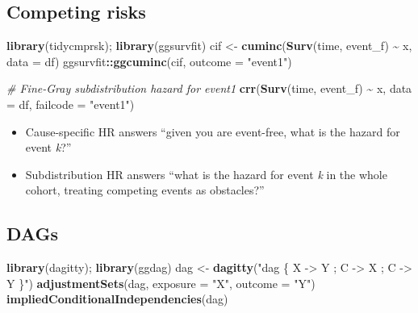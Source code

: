 \documentclass[
]{article}
\newenvironment{Shaded}{\begin{snugshade}}{\end{snugshade}}
\newcommand{\AttributeTok}[1]{\textcolor[rgb]{0.13,0.29,0.53}{#1}}
\newcommand{\CommentTok}[1]{\textcolor[rgb]{0.56,0.35,0.01}{\textit{#1}}}
\newcommand{\FunctionTok}[1]{\textcolor[rgb]{0.13,0.29,0.53}{\textbf{#1}}}
\newcommand{\NormalTok}[1]{#1}
\newcommand{\OtherTok}[1]{\textcolor[rgb]{0.56,0.35,0.01}{#1}}
\newcommand{\SpecialCharTok}[1]{\textcolor[rgb]{0.81,0.36,0.00}{\textbf{#1}}}
\newcommand{\StringTok}[1]{\textcolor[rgb]{0.31,0.60,0.02}{#1}}
\providecommand{\tightlist}{%
  \setlength{\itemsep}{0pt}\setlength{\parskip}{0pt}}
\begin{document}
\subsection{Competing risks}\label{competing-risks}

\begin{Shaded}
\begin{Highlighting}[]
\FunctionTok{library}\NormalTok{(tidycmprsk); }\FunctionTok{library}\NormalTok{(ggsurvfit)}
\NormalTok{cif }\OtherTok{\textless{}{-}} \FunctionTok{cuminc}\NormalTok{(}\FunctionTok{Surv}\NormalTok{(time, event\_f) }\SpecialCharTok{\textasciitilde{}}\NormalTok{ x, }\AttributeTok{data =}\NormalTok{ df)}
\NormalTok{ggsurvfit}\SpecialCharTok{::}\FunctionTok{ggcuminc}\NormalTok{(cif, }\AttributeTok{outcome =} \StringTok{"event1"}\NormalTok{)}

\CommentTok{\# Fine{-}Gray subdistribution hazard for event1}
\FunctionTok{crr}\NormalTok{(}\FunctionTok{Surv}\NormalTok{(time, event\_f) }\SpecialCharTok{\textasciitilde{}}\NormalTok{ x, }\AttributeTok{data =}\NormalTok{ df, }\AttributeTok{failcode =} \StringTok{"event1"}\NormalTok{)}
\end{Highlighting}
\end{Shaded}

\begin{itemize}
\tightlist
\item
  Cause-specific HR answers ``given you are event-free, what is the
  hazard for event \emph{k}?''
\item
  Subdistribution HR answers ``what is the hazard for event \emph{k} in
  the whole cohort, treating competing events as obstacles?''
\end{itemize}

\subsection{DAGs}\label{dags}

\begin{Shaded}
\begin{Highlighting}[]
\FunctionTok{library}\NormalTok{(dagitty); }\FunctionTok{library}\NormalTok{(ggdag)}
\NormalTok{dag }\OtherTok{\textless{}{-}} \FunctionTok{dagitty}\NormalTok{(}\StringTok{"dag \{ X {-}\textgreater{} Y ; C {-}\textgreater{} X ; C {-}\textgreater{} Y \}"}\NormalTok{)}
\FunctionTok{adjustmentSets}\NormalTok{(dag, }\AttributeTok{exposure =} \StringTok{"X"}\NormalTok{, }\AttributeTok{outcome =} \StringTok{"Y"}\NormalTok{)}
\FunctionTok{impliedConditionalIndependencies}\NormalTok{(dag)}
\end{Highlighting}
\end{Shaded}
\end{document}
